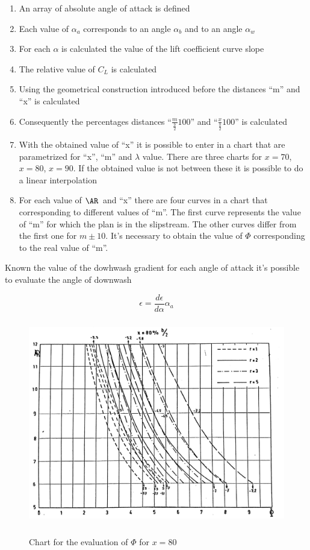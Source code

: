 \begin{enumerate}
	\item An array of absolute angle of attack is defined
	\item Each value of $\alpha_a$ corresponds to an angle $\alpha_b$ and to an angle $\alpha_w$
	\item For each $\alpha$ is calculated the value of the lift coefficient curve slope
	\item The relative value of $C_L$ is calculated
	\item Using the geometrical construction introduced before the distances ``m'' and ``x'' is calculated
	\item Consequently the percentages distances ``$\frac{m}{\frac{b}{2}} 100$'' and ``$\frac{x}{\frac{b}{2}} 100$'' is calculated
	\item With the obtained value of ``x'' it is possible to enter in a chart that are parametrized for ``x'', ``m'' and $\lambda$ value. There are three charts for $x=70$, $x=80$, $x=90$. If the obtained value is not between these it is possible to do a linear interpolation
	\item For each value of $\AR$\ and ``x'' there are four curves in a chart that corresponding to different values of ``m''. The first curve represents the value of ``m'' for which the plan is in the slipstream. The other curves differ from the first one for $m \pm 10$. It's necessary to obtain the value of $\Phi$ corresponding to the real value of  ``m''.
\end{enumerate}

Known the value of the dowhwash gradient for each angle of attack it's possible to evaluate the angle of downwash

\begin{equation}
\epsilon = \frac{d\epsilon}{d\alpha} \alpha_a
\end{equation}
\begin{figure}[H]
\centering
{\includegraphics[height=9cm]{immagini/chartGiordano}} 
\caption{Chart for the evaluation of $\Phi$ for $x=80$}
\label{giordanodata}
\end{figure} 

